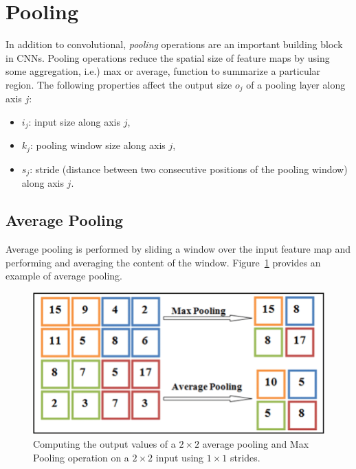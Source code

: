 \section{Pooling}\label{sec:pooling}

In addition to convolutional, {\em pooling\/} operations
are an important building block in CNNs. Pooling operations \cite{lecun1989handwritten} \cite{krizhevsky2012imagenet} reduce the spatial size of feature maps by using some aggregation, i.e.) max or average, function to summarize a particular region.
The following properties affect the output size $o_j$ of a pooling layer
along axis $j$:

\begin{itemize}
    \item $i_j$: input size along axis $j$,
    \item $k_j$: pooling window size along axis $j$,
    \item $s_j$: stride (distance between two consecutive positions of the
        pooling window) along axis $j$.
\end{itemize}
\subsection{Average Pooling}
Average pooling is performed by sliding a window over the input feature map and performing and averaging the content of the window. Figure~\ref{fig:numerical_avg_max_pooling}
provides an example of average pooling.
\begin{figure}
    \centering
    \includegraphics[width=\textwidth]{Figures/Max-pooling-and-average-pooling.png}
    \caption{\label{fig:numerical_avg_max_pooling} Computing the output values
        of a $2 \times 2$ average pooling and Max Pooling operation on a $2 \times 2$ input using $1 \times 1$ strides.}
\end{figure}



